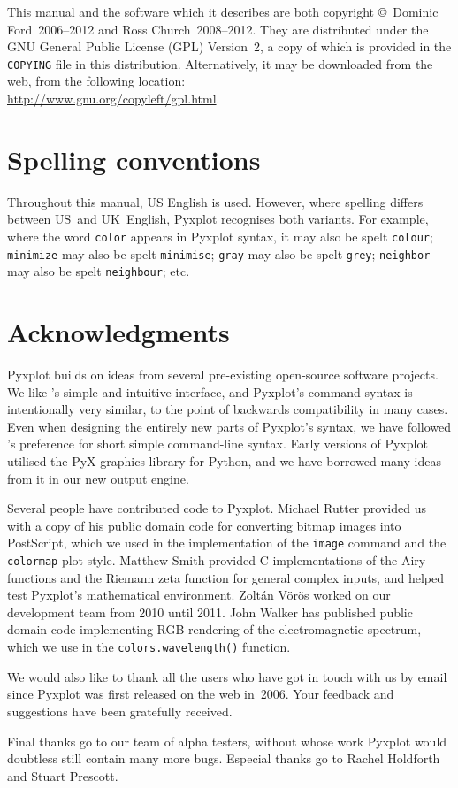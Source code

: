 This manual and the software which it describes are both copyright \copyright\
Dominic Ford~2006--2012 and Ross Church~2008--2012. They are distributed under
the GNU General Public License (GPL) Version~2, a copy of which is provided in
the {\tt COPYING} file in this distribution.\index{General Public
License}\index{license} Alternatively, it may be downloaded from the web, from
the following location:\\ \url{http://www.gnu.org/copyleft/gpl.html}.

\section{Spelling conventions}

Throughout this manual, US English is used. However, where spelling differs
between US~and UK~English, Pyxplot recognises both variants. For example, where
the word \texttt{color} appears in Pyxplot syntax, it may also be spelt
\texttt{colour}; \texttt{minimize} may also be spelt \texttt{minimise};
\texttt{gray} may also be spelt \texttt{grey}; \texttt{neighbor} may also be
spelt \texttt{neighbour}; etc.

\section{Acknowledgments}

Pyxplot builds on ideas from several pre-existing open-source software
projects. We like \gnuplot's simple and intuitive interface, and Pyxplot's
command syntax is intentionally very similar, to the point of backwards
compatibility in many cases. Even when designing the entirely new parts of
Pyxplot's syntax, we have followed \gnuplot's preference for short simple
command-line syntax.  Early versions of Pyxplot utilised the PyX
graphics library for Python, and we have borrowed many ideas from it in our new
output engine.

Several people have contributed code to Pyxplot. Michael Rutter provided us 
with a copy of his public domain code for converting bitmap images into
PostScript, which we used in the implementation of the {\tt image} command and
the {\tt colormap} plot style. Matthew Smith provided C implementations of the
Airy functions and the Riemann zeta function for general complex inputs, and
helped test Pyxplot's mathematical environment. Zolt\'an V\"or\"os worked on
our development team from 2010 until 2011.  John Walker has published public
domain code implementing RGB rendering of the electromagnetic spectrum, which
we use in the {\tt colors.\-wave\-length()} function.

We would also like to thank all the users who have got in touch with us by
email since Pyxplot was first released on the web in~2006. Your feedback and
suggestions have been gratefully received.

Final thanks go to our team of alpha testers, without whose work Pyxplot would
doubtless still contain many more bugs.  Especial thanks go to Rachel Holdforth
and Stuart Prescott.

